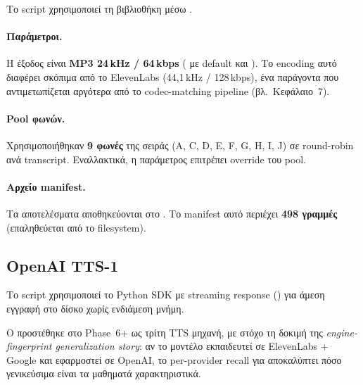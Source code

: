 Το script 
χρησιμοποιεί τη βιβλιοθήκη  μέσω
.

\paragraph{Παράμετροι.}
Η έξοδος είναι \textbf{MP3 24\,kHz / 64\,kbps}
( με default 
και ).
Το encoding αυτό διαφέρει σκόπιμα από το ElevenLabs (44,1\,kHz / 128\,kbps),
ένα παράγοντα που αντιμετωπίζεται αργότερα από το codec-matching
pipeline (βλ.\ Κεφάλαιο~7).

\paragraph{Pool φωνών.}
Χρησιμοποιήθηκαν \textbf{9 φωνές} της σειράς 
(A, C, D, E, F, G, H, I, J) σε round-robin ανά transcript.
Εναλλακτικά, η παράμετρος  επιτρέπει override
του pool.

\paragraph{Αρχείο manifest.}
Τα αποτελέσματα αποθηκεύονται στο
.
Το manifest αυτό περιέχει \textbf{498 γραμμές} (επαληθεύεται από
το filesystem).

\subsection{OpenAI TTS-1}
\label{subsec:openai-tts}

Το script 
χρησιμοποιεί το Python SDK  με streaming response
() για άμεση εγγραφή στο δίσκο
χωρίς ενδιάμεση μνήμη.

Ο  προστέθηκε στο Phase~6+ ως τρίτη TTS μηχανή,
με στόχο τη δοκιμή της \emph{engine-fingerprint generalization story}:
αν το μοντέλο εκπαιδευτεί σε ElevenLabs + Google και εφαρμοστεί σε
OpenAI, το per-provider recall για  αποκαλύπτει
πόσο γενικεύσιμα είναι τα μαθηματά χαρακτηριστικά.

